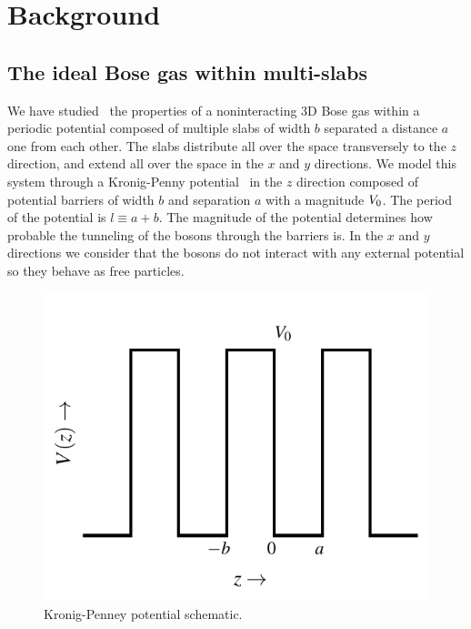 \chapter{Background}%
\label{chap:background}


\section{The ideal Bose gas within multi-slabs}%
\label{sec:the-ideal-bose-gas-within-a-kronig-penney-potential}

We have studied~\cite{bib:rodriguez-msc-thesis.2014,
  bib:rodriguez-j-low-temp-phys.175.2014,
  bib:rodriguez-j-low-temp-phys.183.2016} the properties of a noninteracting 3D
Bose gas within a periodic potential composed of multiple slabs of width $b$
separated a distance $a$ one from each other. The slabs distribute all over
the space transversely to the $z$ direction, and extend all over the space in
the $x$ and $y$ directions. We model this system through a Kronig-Penny
potential~\cite{bib:kronig-proc-roy-soc-lond.130.1931} in the $z$ direction
composed of potential barriers of width $b$ and separation $a$ with a
magnitude ${V_0}$. The period of the potential is $l \equiv a + b$. The
magnitude of the potential determines how probable the tunneling of the bosons
through the barriers is. In the $x$ and $y$ directions we consider that the
bosons do not interact with any external potential so they behave as free
particles.
%
\begin{figure}[h!]
  \centering
  \includegraphics[width=0.6\linewidth]{./figures/kp-potential}
  \caption{Kronig-Penney potential schematic.}\label{fig:kp-potential}
\end{figure}
%

